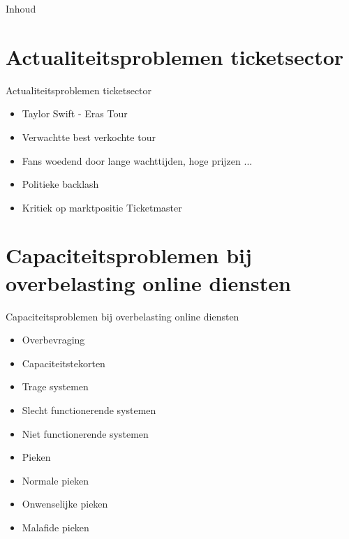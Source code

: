 \documentclass{beamer}
\begin{document}
\begin{frame}{Inhoud}
  \tableofcontents
\end{frame}


\section[Actualiteitsproblemen]{Actualiteitsproblemen ticketsector}
\begin{frame}{Actualiteitsproblemen ticketsector}
    \begin{itemize}
        \item Taylor Swift - Eras Tour
        \item Verwachtte best verkochte tour
        \item Fans woedend door lange wachttijden, hoge prijzen ...
        \item Politieke backlash
        \item Kritiek op marktpositie Ticketmaster
    \end{itemize}
\end{frame}

\section[Capaciteitsproblemen]{Capaciteitsproblemen bij overbelasting online diensten}
\begin{frame}{Capaciteitsproblemen bij overbelasting online diensten}
    \begin{itemize}
        \item Overbevraging
        \item Capaciteitstekorten
        \item Trage systemen
        \item Slecht functionerende systemen
        \item Niet functionerende systemen
        \item Pieken
        \item Normale pieken
        \item Onwenselijke pieken
        \item Malafide pieken
    \end{itemize}
\end{frame}
\end{document}

